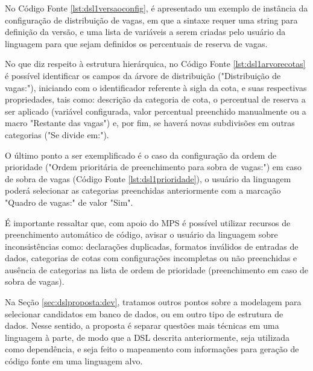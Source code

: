    No Código Fonte \ref{lst:dsl1versaoconfig}, é apresentado um exemplo de instância da configuração de distribuição de vagas, em que a sintaxe requer uma string para definição da versão, e uma lista de variáveis a serem criadas pelo usuário da linguagem para que sejam definidos os percentuais de reserva de vagas.
   
   


No que diz respeito à estrutura hierárquica, no Código Fonte \ref{lst:dsl1arvorecotas} é possível identificar os campos da árvore de distribuição ("Distribuição de vagas:"), iniciando com o identificador referente à sigla da cota, e suas respectivas propriedades, tais como: descrição da categoria de cota, o percentual de reserva a ser aplicado (variável configurada, valor percentual preenchido manualmente ou a macro "Restante das vagas") e, por fim, se haverá novas subdivisões em outras categorias ("Se divide em:").

   


O último ponto a ser exemplificado é o caso da configuração da ordem de prioridade ("Ordem prioritária de preenchimento para sobra de vagas:") em caso de sobra de vagas (Código Fonte \ref{lst:dsl1prioridade}), o usuário da linguagem poderá selecionar as categorias preenchidas anteriormente com a marcação "Quadro de vagas:" de valor "Sim".  

   

É importante ressaltar que, com apoio do \gls{MPS} é possível utilizar recursos de preenchimento automático de código, avisar o usuário da linguagem sobre inconsistências como: declarações duplicadas, formatos inválidos de entradas de dados, categorias de cotas com configurações incompletas ou não preenchidas e ausência de categorias na lista de ordem de prioridade (preenchimento em caso de sobra de vagas). 

Na Seção \ref{sec:dslproposta:dev}, tratamos outros pontos sobre a modelagem para selecionar candidatos em banco de dados, ou em outro tipo de estrutura de dados. Nesse sentido, a proposta é separar questões mais técnicas em uma linguagem à parte, de modo que a \gls{DSL} descrita anteriormente, seja utilizada como dependência, e seja feito o mapeamento com informações para geração de código fonte em uma linguagem alvo.